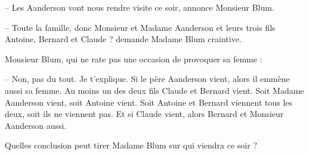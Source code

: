 
\begin{exercice}\label{exo2smath-0016}

-- Les Aanderson vont nous rendre visite ce soir, annonce Monsieur Blum. 

-- Toute la famille, donc Monsieur et Madame Aanderson et leurs trois fils Antoine, Bernard et Claude ? demande Madame Blum craintive.

Monsieur Blum, qui ne rate pas une occasion de provoquer sa femme :

-- Non, pas du tout. Je t’explique. Si le père Aanderson vient, alors il emmène aussi sa femme. Au moins un des deux fils Claude et Bernard vient. Soit Madame Aanderson vient, soit Antoine vient. Soit Antoine et Bernard viennent tous les deux, soit ils ne viennent pas. Et si Claude vient, alors Bernard et Monsieur Aanderson aussi.

Quelles conclusion peut tirer Madame Blum sur qui viendra ce soir ? 

\end{exercice}
